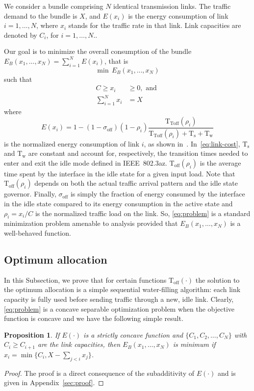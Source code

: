 \documentclass[journal,english,twocolumn,10pt,letterpaper]{IEEEtran}
\newcommand{\added}[1]{{#1}}
\newtheorem{proposition}[theorem]{Proposition}
\newcommand{\Constantconstant}[2]{\mathrm{#1}_{\mathrm{#2}}}
\newcommand{\Ts}{\Constantconstant T s}
\newcommand{\Tw}{\Constantconstant T w}
\newcommand{\Toff}{\mathrm{T}_{\mathrm{off}}}
\begin{document}
We consider a bundle comprising $N$ identical transmission links. The traffic
demand to the bundle is $X$, and $E(x_i)$ is the energy consumption of link
$i = 1, \dots, N$, where $x_i$ stands for the traffic rate in that link. Link
capacities are denoted by $C_i$, for $i = 1, \dots, N$.. 

Our goal is to minimize the overall consumption of the bundle $E\added{_B}(x_1, \dots,
x_N) = \sum_{i = 1}^N E(x_i)$, that is
\begin{equation}
  \label{eq:problem}
  \min \,E\added{_B}(x_1, \dots, x_N)
\end{equation}
such that
\begin{align}
  C \geq x_i &\geq 0, \text{ and }\\
  \sum_{i = 1}^N x_i &= X
\end{align}
where 
\begin{equation}
  \label{eq:link-cost}
  E(x_i) = 1 - (1 - \sigma_{\text{off}})(1 - \rho_i)
  \frac{\mathrm{T}_{\mathrm{Toff}}(\rho_i)}{\mathrm{T}_{\mathrm{Toff}}(\rho_i) + \mathrm{T}_{\mathrm{s}} + \mathrm{T}_{\mathrm{w}}}
\end{equation}
is the normalized energy consumption of link $i$, as shown
in~\cite{herreria12:_gi_g_model_gb_energ_effic_ether}.
In~\eqref{eq:link-cost}, $\Ts$ and $\Tw$ are constant and account for,
respectively, the transition times needed to enter and exit the idle mode
defined in IEEE~802.\added{3}az. $\Toff(\rho_i)$ is the average time spent by the
interface in the idle state for a given input load. Note that $\Toff(\rho_i)$
depends on both the actual traffic arrival pattern and the idle state
governor. Finally, $\sigma_{\text{off}}$ is simply the fraction of energy
consumed by the interface in the idle state compared to its energy consumption
in the active state and $\rho_i = x_i / C$ is the normalized traffic load on
the \added{link. So}, \eqref{eq:problem} is a standard minimization problem
amenable to analysis provided that $E\added{_B}(x_1, \dots, x_N)$ is a well-behaved
function.

\subsection{Optimum allocation}
\label{sec:optimal-allocation}

In this Subsection, we prove that for certain functions $\Toff(\cdot)$ the
solution to the optimum allocation is a simple sequential water-filling
algorithm: each link capacity is fully used before sending traffic through a
new, idle link. Clearly, \eqref{eq:problem} is a concave separable
optimization problem when the objective function is concave and we have the
following simple result.
\begin{proposition}
\label{propo:waterfill}
\added{ If $E(\cdot)$ is a strictly concave function and
  $\{C_1, C_2, \ldots, C_N\}$ with $C_i \ge C_{i+1}$ are the link capacities,
  then 
$E\added{_B}(x_1,\ldots, x_N)$ is minimum if $x_i = \min\{C_i,
X-\sum_{j<i}x_j\}$.
}
\end{proposition}
\begin{proof}
  The proof is a direct consequence of the subadditivity of $E(\cdot)$ and is
  given in \added{Appendix}~\ref{sec:proof}.
\end{proof}
\end{document}
